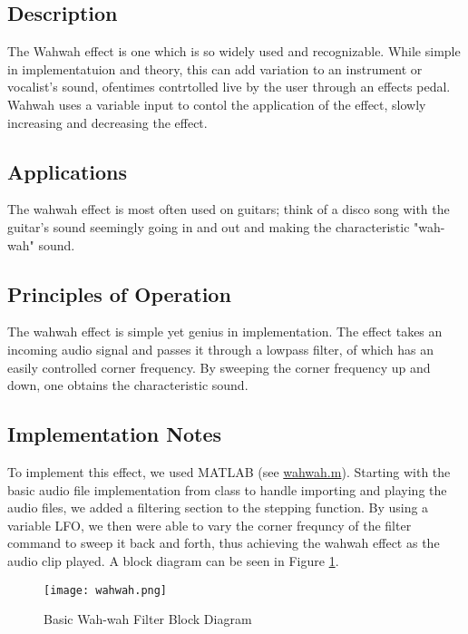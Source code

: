 \subsection{Description}
The Wahwah effect is one which is so widely used and recognizable. While simple in implementatuion and theory, this can add variation to an instrument or vocalist's sound, ofentimes contrtolled live by the user through an effects pedal. Wahwah uses a variable input to contol the application of the effect, slowly increasing and decreasing the effect.

\subsection{Applications}
The wahwah effect is most often used on guitars; think of a disco song with the guitar's sound seemingly going in and out and making the characteristic "wah-wah" sound.

\subsection{Principles of Operation}
The wahwah effect is simple yet genius in implementation. The effect takes an incoming audio signal and passes it through a lowpass filter, of which has an easily controlled corner frequency. By sweeping the corner frequency up and down, one obtains the characteristic sound.

\subsection{Implementation Notes}
To implement this effect, we used MATLAB (see \href{run:../wahwah.m}{wahwah.m}). Starting with the basic audio file implementation from class to handle importing and playing the audio files, we added a filtering section to the stepping function. By using a variable LFO, we then were able to vary the corner frequncy of the filter command to sweep it back and forth, thus achieving the wahwah effect as the audio clip played. A block diagram can be seen in Figure \ref{fig:Wahwah-block-diagram}.
\begin{figure}[ht]
	\centering
	\texttt{[image: wahwah.png]}
	\caption{Basic Wah-wah Filter Block Diagram}
	\label{fig:Wahwah-block-diagram}
\end{figure}



